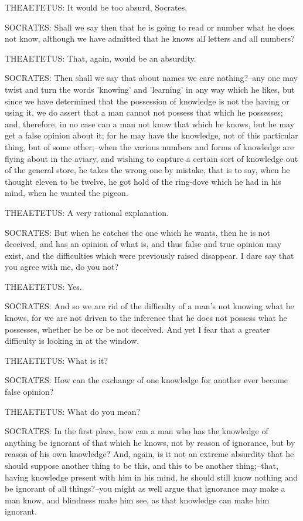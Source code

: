 THEAETETUS: It would be too absurd, Socrates.

SOCRATES: Shall we say then that he is going to read or number what he
does not know, although we have admitted that he knows all letters and
all numbers?

THEAETETUS: That, again, would be an absurdity.

SOCRATES: Then shall we say that about names we care nothing?--any one
may twist and turn the words 'knowing' and 'learning' in any way which
he likes, but since we have determined that the possession of knowledge
is not the having or using it, we do assert that a man cannot not
possess that which he possesses; and, therefore, in no case can a man
not know that which he knows, but he may get a false opinion about it;
for he may have the knowledge, not of this particular thing, but of some
other;--when the various numbers and forms of knowledge are flying about
in the aviary, and wishing to capture a certain sort of knowledge out
of the general store, he takes the wrong one by mistake, that is to say,
when he thought eleven to be twelve, he got hold of the ring-dove which
he had in his mind, when he wanted the pigeon.

THEAETETUS: A very rational explanation.

SOCRATES: But when he catches the one which he wants, then he is not
deceived, and has an opinion of what is, and thus false and true opinion
may exist, and the difficulties which were previously raised disappear.
I dare say that you agree with me, do you not?

THEAETETUS: Yes.

SOCRATES: And so we are rid of the difficulty of a man's not knowing
what he knows, for we are not driven to the inference that he does not
possess what he possesses, whether he be or be not deceived. And yet I
fear that a greater difficulty is looking in at the window.

THEAETETUS: What is it?

SOCRATES: How can the exchange of one knowledge for another ever become
false opinion?

THEAETETUS: What do you mean?

SOCRATES: In the first place, how can a man who has the knowledge of
anything be ignorant of that which he knows, not by reason of ignorance,
but by reason of his own knowledge? And, again, is it not an extreme
absurdity that he should suppose another thing to be this, and this to
be another thing;--that, having knowledge present with him in his mind,
he should still know nothing and be ignorant of all things?--you might
as well argue that ignorance may make a man know, and blindness make him
see, as that knowledge can make him ignorant.

